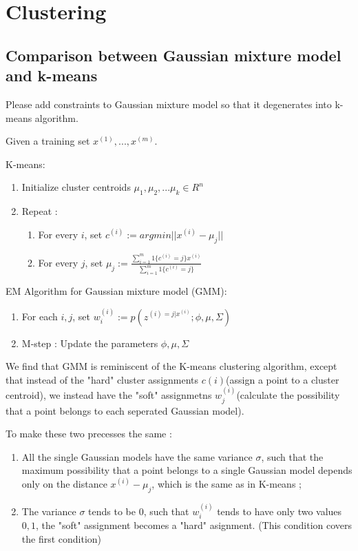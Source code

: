 \documentclass{article}
\newenvironment{answer}{\par\color{ForestGreen}}{\par}
\begin{document}
\section{Clustering}
\subsection{Comparison between Gaussian mixture model and k-means}
Please add constraints to Gaussian mixture model so that it degenerates into k-means algorithm.
\begin{answer}

Given a training set ${x^{(1)},...,x^{(m)}}$.

K-means:
\begin{enumerate}
  \item Initialize cluster centroids $\mu_1, \mu_2,...\mu_k \in R^n$
  \item Repeat :
   \begin{enumerate}
    \item For every $i$, set $c^{(i)} := arg min ||x^{(i)} - \mu_j||$
    \item For every $j$, set $\mu_j := \frac{\sum_{i=1}^m1\{c^{(i)} = j\}x^{(i)}}{\sum_{i=1}^m1\{c^{(i)} = j\}}$
    \end{enumerate}
\end{enumerate}

EM Algorithm for Gaussian mixture model (GMM):
\begin{enumerate}
  \item For each $i,j$, set $w_i^{(i)} :=p(z^{(i) = j|x^{(i)}};\phi, \mu,\Sigma)$
  \item M-step : Update the parameters $\phi, \mu,\Sigma$
\end{enumerate}


We find that GMM is reminiscent of the K-means clustering algorithm, except that instead of the "hard" cluster assignments $c(i)$(assign a point to a cluster centroid), we instead have the "soft" assignmetns $w_j^{(i)}$(calculate the possibility that a point belongs to each seperated Gaussian model).

To make these two precesses the same :
\begin{enumerate}
  \item All the single Gaussian models have the same variance $\sigma$, such that the maximum possibility that a point belongs to a single Gaussian model  depends only on the distance $x^{(i)} - \mu_j$, which is the same as in K-means ;
  \item The variance $\sigma$ tends to be $0$, such that $w_i^{(i)}$ tends to have only two values $0, 1$, the "soft" assignment becomes a "hard" asignment. (This condition covers the first condition)
\end{enumerate}

\end{answer}
\end{document}

